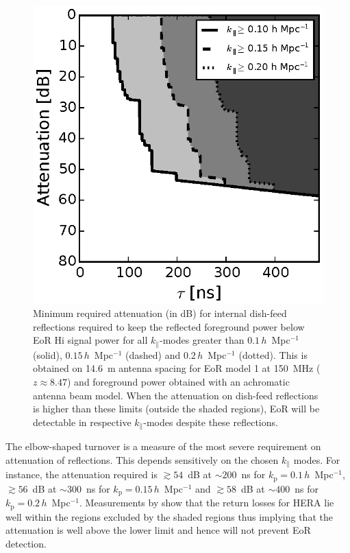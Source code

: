 \documentclass[preprint2,iop,numberedappendix,twocolappendix,appendixfloats]{emulateapj}
\begin{document}
\begin{figure}[htb]
\centering
\includegraphics[width=\linewidth]{spec_on_achrmbeam_foreground_reflected_power_21cmfast_14.6m_150.0_MHz_subband_v2.eps}
\caption{Minimum required attenuation (in dB) for internal dish-feed reflections required to keep the reflected foreground power below EoR H{\sc i} signal power for all $k_\parallel$-modes greater than $0.1\,h$~Mpc$^{-1}$ (solid), $0.15\,h$~Mpc$^{-1}$ (dashed) and $0.2\,h$~Mpc$^{-1}$ (dotted). This is obtained on 14.6~m antenna spacing for EoR model 1 at 150~MHz ($z\approx 8.47$) and foreground power obtained with an achromatic antenna beam model. When the attenuation on dish-feed reflections is higher than these limits (outside the shaded regions), EoR will be detectable in respective $k_\parallel$-modes despite these reflections.}
\label{fig:fg-reflections-achrmbeam}
\end{figure}

The elbow-shaped turnover is a measure of the most severe requirement on attenuation of reflections. This depends sensitively on the chosen $k_\parallel$ modes. For instance, the attenuation required is $\gtrsim 54$~dB at $\sim 200$~ns for $k_\textrm{p}=0.1\,h$~Mpc$^{-1}$, $\gtrsim 56$~dB at $\sim 300$~ns for $k_\textrm{p}=0.15\,h$~Mpc$^{-1}$ and $\gtrsim 58$~dB at $\sim 400$~ns for $k_\textrm{p}=0.2\,h$~Mpc$^{-1}$. Measurements by \citet{pat16} show that the return losses for HERA lie well within the regions excluded by the shaded regions thus implying that the attenuation is well above the lower limit and hence will not prevent EoR detection.
\end{document}
